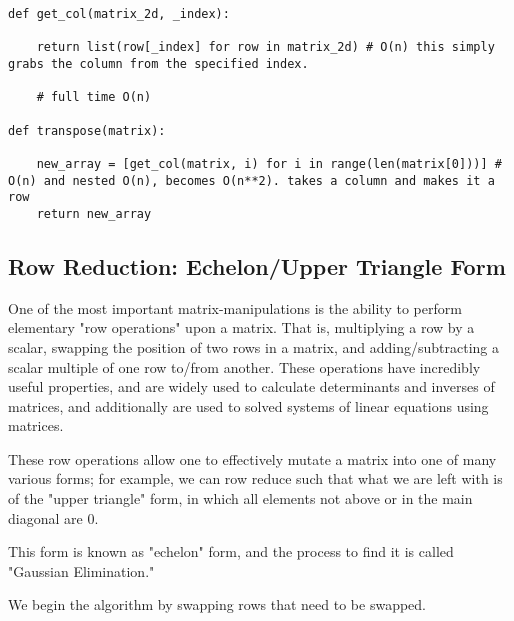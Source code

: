 \documentclass[12pt, a4paper]{article}
\begin{document}
\begin{lstlisting}
def get_col(matrix_2d, _index):

    return list(row[_index] for row in matrix_2d) # O(n) this simply grabs the column from the specified index. 

    # full time O(n)

def transpose(matrix):

    new_array = [get_col(matrix, i) for i in range(len(matrix[0]))] # O(n) and nested O(n), becomes O(n**2). takes a column and makes it a row
    return new_array

\end{lstlisting}

\subsection{Row Reduction: Echelon/Upper Triangle Form}

One of the most important matrix-manipulations is the ability to perform elementary "row operations" upon a matrix. 
That is, multiplying a row by a scalar, swapping the position of two rows in a matrix, and adding/subtracting a scalar multiple of one row to/from another. 
These operations have incredibly useful properties, and are widely used to calculate determinants and inverses of matrices, and 
additionally are used to solved systems of linear equations using matrices. 

These row operations allow one to effectively mutate a matrix into one of many various forms; for example, we can row reduce such that
what we are left with is of the "upper triangle" form, in which all elements not above or in the main diagonal are 0. 

This form is known as "echelon" form, and the process to find it is called "Gaussian Elimination."

We begin the algorithm by swapping rows that need to be swapped. 
\end{document}
